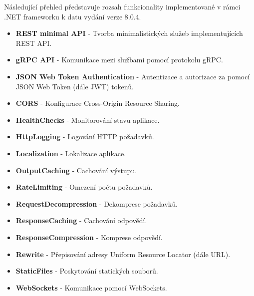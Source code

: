 
Následující přehled představuje rozsah funkcionality implementované v rámci .NET frameworku k datu vydání verze 8.0.4. \cite{aspnetdocs}

\begin{itemize}
    \item \textbf{REST minimal API} - Tvorba minimalistických služeb implementujících REST API.
    \item \textbf{gRPC API} - Komunikace mezi službami pomocí protokolu gRPC.
    \item \textbf{JSON Web Token Authentication} - Autentizace a autorizace za pomocí JSON Web Token (dále JWT) tokenů.
    \item \textbf{CORS} - Konfigurace Cross-Origin Resource Sharing.
    \item \textbf{HealthChecks} - Monitorování stavu aplikace.
    \item \textbf{HttpLogging} - Logování HTTP požadavků.
    \item \textbf{Localization} - Lokalizace aplikace.
    \item \textbf{OutputCaching} - Cachování výstupu.
    \item \textbf{RateLimiting} - Omezení počtu požadavků.
    \item \textbf{RequestDecompression} - Dekomprese požadavků.
    \item \textbf{ResponseCaching} - Cachování odpovědí.
    \item \textbf{ResponseCompression} - Komprese odpovědí.
    \item \textbf{Rewrite} - Přepisování adresy Uniform Resource Locator (dále URL).
    \item \textbf{StaticFiles} - Poskytování statických souborů.
    \item \textbf{WebSockets} - Komunikace pomocí WebSockets.
\end{itemize}
